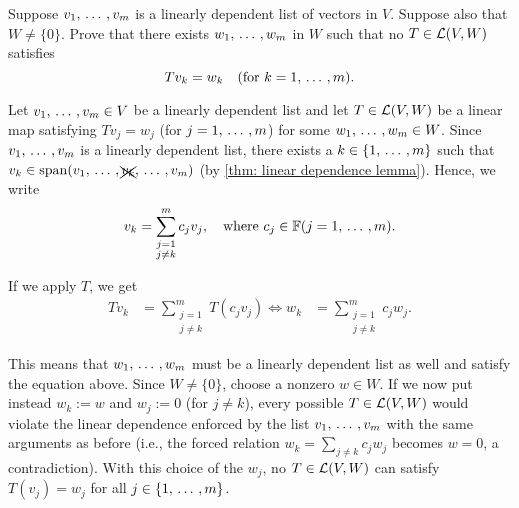 \begin{xrcs}
  Suppose $v_1, {\, \ldots \,\,}, v_m$ is a linearly dependent list of vectors in $V$. Suppose also that $W \neq \{0\}$. Prove that there exists $w_1, {\, \ldots \,\,}, w_m$ in $W$ such that no $T \in \mathcal{L}(V,W)$ satisfies
  \begin{equation}
    Tv_k = w_k \quad \text{(for $k=1, {\, \ldots \,\,}, m$)}.
  \end{equation}
\end{xrcs}
\begin{xsol}
  Let $v_1, {\, \ldots \,\,}, v_m \in V$ be a linearly dependent list and let $T \in \mathcal{L}(V,W)$ be a linear map satisfying $T v_j = w_j$ (for $j=1, {\, \ldots \,\,}, m$) for some $w_1, {\, \ldots \,\,}, w_m \in W$.
  Since $v_1, {\, \ldots \,\,}, v_m$ is a linearly dependent list, there exists a $k \in \{1, {\, \ldots \,\,}, m\}$ such that $v_k \in \operatorname{span} (v_1, {\, \ldots \,\,}, \xcancel{v_k}, {\, \ldots \,\,}, v_m)$ (by \ref{thm: linear dependence lemma}). Hence, we write
  \begin{equation}
    v_k = \sum_{\substack{j = 1 \\ j \neq k}}^{m} c_j v_j, \quad \text{where } c_j \in \mathbb{F} (j=1,{\, \ldots \,\,},m).
  \end{equation}

  If we apply $T$, we get
  \begin{equation}
    \begin{aligned}
      T v_k &= \sum_{\substack{j = 1 \\ j \neq k}}^{m} T(c_j v_j) \iff
      w_k &= \sum_{\substack{j = 1 \\ j \neq k}}^{m} c_j w_j.
    \end{aligned}
  \end{equation}

  This means that $w_1, {\, \ldots \,\,}, w_m$ must be a linearly dependent list as well and satisfy the equation above. Since $W \neq \{0\}$, choose a nonzero $w \in W$. If we now put instead $w_k := w$ and $w_j := 0$ (for $j \neq k$), every possible $T \in \mathcal{L}(V,W)$ would violate the linear dependence enforced by the list $v_1, {\, \ldots \,\,}, v_m$ with the same arguments as before (i.e., the forced relation $w_k = \sum_{j \neq k} c_j w_j$ becomes $w=0$, a contradiction). With this choice of the $w_j$, no $T \in \mathcal{L} (V,W)$ can satisfy $T (v_j) = w_j$ for all $j \in \{1, {\, \ldots \,\,}, m\}$.
\end{xsol}